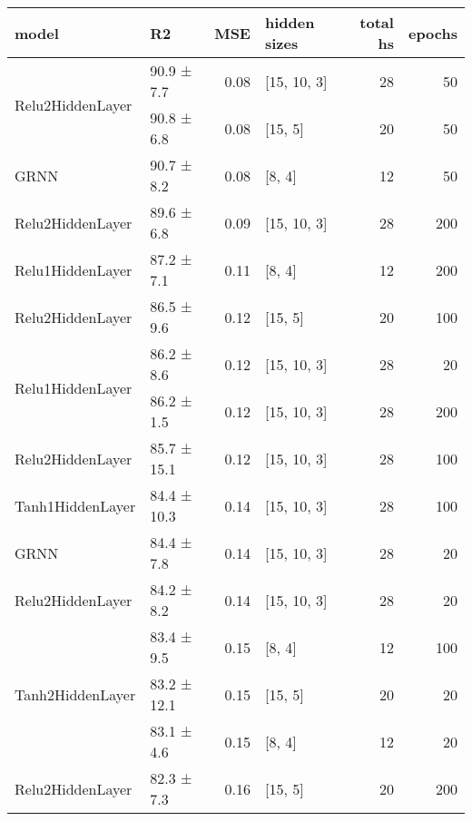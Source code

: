 
    \begin{table*}[h]
        \centering
        \begin{tabular}{llrlrr}
\hline
 model                                      & R2          &   MSE & hidden sizes   &   total hs &   epochs \\
\hline
 \hline
\multirow{2}{*}{Relu2HiddenLayer}   & 90.9 ± 7.7  &  0.08 & [15, 10, 3]    &         28 &       50 \\
                                            & 90.8 ± 6.8  &  0.08 & [15, 5]        &         20 &       50 \\
 \hline
GRNN                                & 90.7 ± 8.2  &  0.08 & [8, 4]         &         12 &       50 \\
 \hline
Relu2HiddenLayer                    & 89.6 ± 6.8  &  0.09 & [15, 10, 3]    &         28 &      200 \\
 \hline
Relu1HiddenLayer                    & 87.2 ± 7.1  &  0.11 & [8, 4]         &         12 &      200 \\
 \hline
Relu2HiddenLayer                    & 86.5 ± 9.6  &  0.12 & [15, 5]        &         20 &      100 \\
 \hline
\multirow{2}{*}{Relu1HiddenLayer}   & 86.2 ± 8.6  &  0.12 & [15, 10, 3]    &         28 &       20 \\
                                            & 86.2 ± 1.5  &  0.12 & [15, 10, 3]    &         28 &      200 \\
 \hline
Relu2HiddenLayer                    & 85.7 ± 15.1 &  0.12 & [15, 10, 3]    &         28 &      100 \\
 \hline
Tanh1HiddenLayer                    & 84.4 ± 10.3 &  0.14 & [15, 10, 3]    &         28 &      100 \\
 \hline
GRNN                                & 84.4 ± 7.8  &  0.14 & [15, 10, 3]    &         28 &       20 \\
 \hline
Relu2HiddenLayer                    & 84.2 ± 8.2  &  0.14 & [15, 10, 3]    &         28 &       20 \\
 \hline
\multirow{3}{*}{Tanh2HiddenLayer}   & 83.4 ± 9.5  &  0.15 & [8, 4]         &         12 &      100 \\
                                            & 83.2 ± 12.1 &  0.15 & [15, 5]        &         20 &       20 \\
                                            & 83.1 ± 4.6  &  0.15 & [8, 4]         &         12 &       20 \\
 \hline
Relu2HiddenLayer                    & 82.3 ± 7.3  &  0.16 & [15, 5]        &         20 &      200 \\

\end{tabular}
\end{table*}
